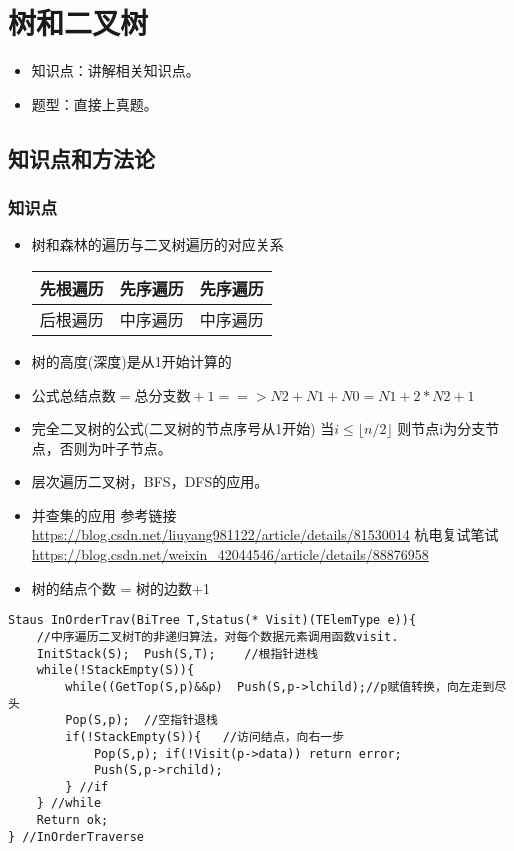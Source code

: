 
\chapter{树和二叉树}
\label{chap2}

\begin{itemize}[noitemsep,topsep=0pt,parsep=0pt,partopsep=0pt]
	\item 知识点：讲解相关知识点。
	\item 题型：直接上真题。
\end{itemize}

\section{知识点和方法论}

\subsection{知识点}
\begin{itemize}[noitemsep,topsep=0pt,parsep=0pt,partopsep=0pt]
	\item 树和森林的遍历与二叉树遍历的对应关系
	~\\
	\begin{center}
	\begin{tabular}{|c|c|c|}%
		\hline  %
		先根遍历 & 先序遍历 & 先序遍历 \\
		\hline  %
		后根遍历 & 中序遍历 & 中序遍历 \\
		\hline %
	\end{tabular}
	\end{center}
	\item 树的高度(深度)是从1开始计算的
	\item 公式$总结点数 = 总分支数 + 1   ==>  N2 + N1 + N0 = N1 + 2*N2 + 1$
	\item 完全二叉树的公式(二叉树的节点序号从1开始) $ 当 i \le \lfloor n/2 \rfloor $ 则节点i为分支节点，否则为叶子节点。
	\item 层次遍历二叉树，BFS，DFS的应用。
	\item 并查集的应用 参考链接 \url{https://blog.csdn.net/liuyang981122/article/details/81530014} 杭电复试笔试 \url{https://blog.csdn.net/weixin_42044546/article/details/88876958}
	\item 树的结点个数 = 树的边数+1
\end{itemize}
\begin{lstlisting}[basicstyle=\small\ttfamily, caption={}, numbers=none]
Staus InOrderTrav(BiTree T,Status(* Visit)(TElemType e)){
	//中序遍历二叉树T的非递归算法，对每个数据元素调用函数visit.
	InitStack(S);  Push(S,T);    //根指针进栈
	while(!StackEmpty(S)){
		while((GetTop(S,p)&&p)  Push(S,p->lchild);//p赋值转换，向左走到尽头
		Pop(S,p);  //空指针退栈
		if(!StackEmpty(S)){   //访问结点，向右一步
			Pop(S,p); if(!Visit(p->data)) return error;
			Push(S,p->rchild);
		} //if
	} //while
	Return ok;
} //InOrderTraverse
\end{lstlisting}

